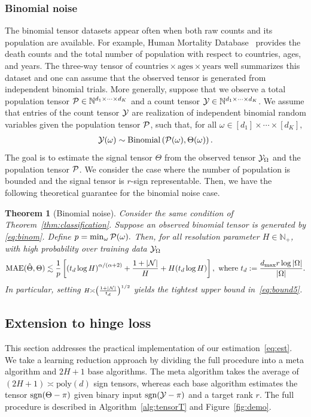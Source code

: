 \documentclass[twoside,11pt]{article}
\theoremstyle{plain}
\newtheorem{thm}{Theorem}
\theoremstyle{definition}
\def\sign{\textup{sgn}}
\begin{document}
\subsubsection{Binomial noise} The binomial tensor datasets appear often when both raw counts and its population are available. For example, Human Mortality Database~\citep{jdanov2019human} provides the death counts and the total number of population with respect to countries, ages, and years. The three-way tensor of $\text{countries}\times\text{ages}\times\text{years}$ well summarizes this dataset and one can assume that the observed tensor is generated from independent binomial trials.
More generally, suppose that we observe a total population tensor $\mathcal{P}\in\mathbb{N}^{d_1\times \cdots\times d_K}$ and a count tensor $\mathcal{Y}\in\mathbb{N}^{d_1\times\cdots\times d_K}$. We assume that  entries of the count tensor $\mathcal{Y}$ are realization of independent binomial random variables given the population tensor $\mathcal{P}$, such that, for all $\omega\in[d_1]\times \cdots\times [d_K],$
\begin{align}\label{eq:binom}
    \mathcal{Y}(\omega) \sim \text{Binomial}\left(\mathcal{P}(\omega),\Theta(\omega)\right).
\end{align}
The goal is to estimate the signal tensor $\Theta$ from the observed tensor $\mathcal{Y}_\Omega$ and the population tensor $\mathcal{P}$. We consider the case where the number of population is bounded and the signal tensor is $r$-sign representable. Then, we have the following theoretical guarantee for the binomial noise case.
\begin{thm}[Binomial noise]\label{thm:binom}
Consider the same condition of Theorem~\ref{thm:classification}. Suppose an observed binomial tensor is generated by \eqref{eq:binom}. Define $p = \min_{\omega}\mathcal{P}(\omega).$ Then, for all resolution parameter $H\in\mathbb{N}_{+}$, with high probability over training data $\mathcal{Y}_\Omega$
\begin{equation}\label{eq:bound5}
\textup{MAE}(\hat \Theta, \Theta)\lesssim \frac{1}{p}\left[\left(t_d\log H\right)^{\alpha/(\alpha+2)}+{1+|\mathcal{N}|\over H}+{H( t_d\log H)}\right],\text{ where } t_d :={ d_{\max}r\log |\Omega|\over |\Omega|}.
\end{equation}
In particular, setting $\scriptstyle H\asymp \left({1+|\mathcal{N}|\over t_d} \right)^{1/2}$ yields the tightest upper bound in~\eqref{eq:bound5}.
\end{thm}


\subsection{Extension to hinge loss}
This section addresses the practical implementation of our estimation~\eqref{eq:est}. We take a learning reduction approach by dividing the full procedure into a meta algorithm and $2H+1$ base algorithms. The meta algorithm takes the average of $(2H+1)\asymp \text{poly}(d)$ sign tensors, whereas each base algorithm estimates the tensor $\sign(\Theta-\pi)$ given binary input $\sign(\tY-\pi)$ and a target rank $r$. The full procedure is described in Algorithm~\ref{alg:tensorT} and Figure~\ref{fig:demo}.
\end{document}
